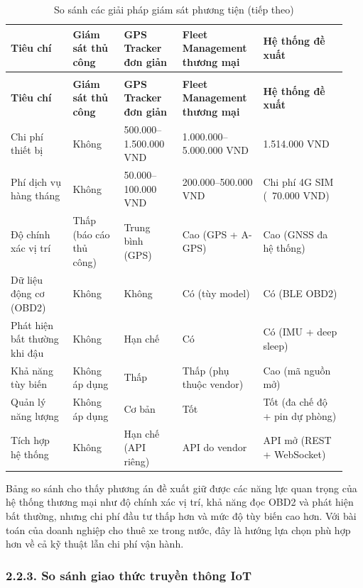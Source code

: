 \documentclass[a4paper]{extarticle}
\newcommand{\thesissettableid}[2]{%
  \renewcommand{\thetable}{#1}%
  \renewcommand{\theHtable}{#2}%
}
\begin{document}
{\thesissettableid{2.1}{tab-ch2-vehicle-monitoring-solutions-comparison}
\def\LTcaptype{table}
\begin{longtable}{|L{0.179\linewidth}|L{0.141\linewidth}|L{0.167\linewidth}|L{0.227\linewidth}|L{0.231\linewidth}|}
\caption{So sánh các giải pháp giám sát phương tiện}\label{tab:ch2-vehicle-monitoring-solutions-comparison}\\
\hline \textbf{Tiêu chí} & \textbf{Giám sát thủ công} & \textbf{GPS Tracker đơn giản} & \textbf{Fleet Management
thương mại} & \textbf{Hệ thống đề xuất} \\
\hline
\endfirsthead
\caption[]{So sánh các giải pháp giám sát phương tiện (tiếp theo)}\\
\hline \textbf{Tiêu chí} & \textbf{Giám sát thủ công} & \textbf{GPS Tracker đơn giản} & \textbf{Fleet Management
thương mại} & \textbf{Hệ thống đề xuất} \\
\hline
\endhead
\hline
\endfoot
\endlastfoot
Chi phí thiết bị & Không & 500.000--1.500.000 VND & 1.000.000--5.000.000
VND & 1.514.000 VND \\\hline
Phí dịch vụ hàng tháng & Không & 50.000--100.000 VND & 200.000--500.000
VND & Chi phí 4G SIM (~70.000 VND) \\\hline
Độ chính xác vị trí & Thấp (báo cáo thủ công) & Trung bình (GPS) & Cao
(GPS + A-GPS) & Cao (GNSS đa hệ thống) \\\hline
Dữ liệu động cơ (OBD2) & Không & Không & Có (tùy model) & Có (BLE
OBD2) \\\hline
Phát hiện bất thường khi đậu & Không & Hạn chế & Có & Có (IMU + deep
sleep) \\\hline
Khả năng tùy biến & Không áp dụng & Thấp & Thấp (phụ thuộc vendor) & Cao
(mã nguồn mở) \\\hline
Quản lý năng lượng & Không áp dụng & Cơ bản & Tốt & Tốt (đa chế độ + pin
dự phòng) \\\hline
Tích hợp hệ thống & Không & Hạn chế (API riêng) & API do vendor & API mở
(REST + WebSocket) \\\hline
\end{longtable}
}

Bảng so sánh cho thấy phương án đề xuất giữ được các năng lực quan trọng
của hệ thống thương mại như độ chính xác vị trí, khả năng đọc OBD2 và
phát hiện bất thường, nhưng chi phí đầu tư thấp hơn và mức độ tùy biến
cao hơn. Với bài toán của doanh nghiệp cho thuê xe trong nước, đây là
hướng lựa chọn phù hợp hơn về cả kỹ thuật lẫn chi phí vận hành.

\subsubsection{2.2.3. So sánh giao thức truyền thông
IoT}\label{223-so-suxe1nh-giao-thux1ee9c-truyux1ec1n-thuxf4ng-iot}
\end{document}

